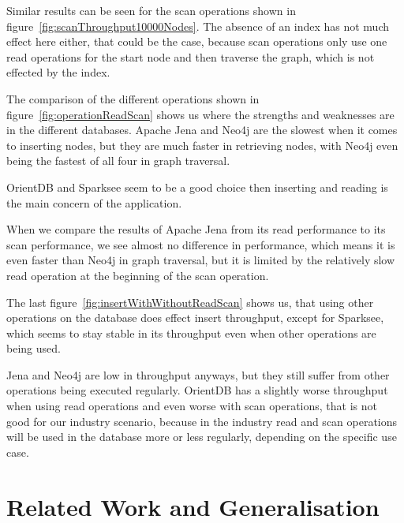 Similar results can be seen for the scan operations shown in figure~\ref{fig:scanThroughput10000Nodes}.
The absence of an index has not much effect here either,
that could be the case,
because scan operations only use one read operations for the start node and then traverse the graph,
which is not effected by the index.

The comparison of the different operations shown in figure~\ref{fig:operationReadScan} shows us where the strengths and weaknesses are in the different databases.
Apache Jena and Neo4j are the slowest when it comes to inserting nodes,
but they are much faster in retrieving nodes,
with Neo4j even being the fastest of all four in graph traversal.

OrientDB and Sparksee seem to be a good choice then inserting and reading is the main concern of the application.

When we compare the results of Apache Jena from its read performance to its scan performance,
we see almost no difference in performance,
which means it is even faster than Neo4j in graph traversal,
but it is limited by the relatively slow read operation at the beginning of the scan operation.

The last figure~\ref{fig:insertWithWithoutReadScan} shows us,
that using other operations on the database does effect insert throughput,
except for Sparksee,
which seems to stay stable in its throughput even when other operations are being used.

Jena and Neo4j are low in throughput anyways,
but they still suffer from other operations being executed regularly.
OrientDB has a slightly worse throughput when using read operations and even worse with scan operations,
that is not good for our industry scenario,
because in the industry read and scan operations will be used in the database more or less regularly,
depending on the specific use case.

\section{Related Work and Generalisation}
